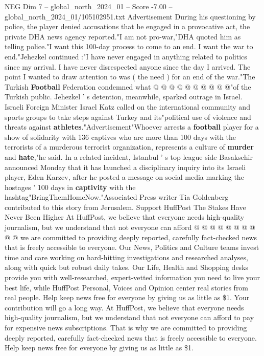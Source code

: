 \begin{textsample}{NEG Dim 7 – global\_north\_2024\_01 – Score -7.00 – global\_north\_2024\_01/105102951.txt}
Advertisement During his questioning by police, the player denied accusations that he engaged in a provocative act, the private DHA news agency reported."I am not pro-war,"DHA quoted him as telling police."I want this 100-day process to come to an end.
I want the war to end."Jehezkel continued :"I have never engaged in anything related to politics since my arrival.
I have never disrespected anyone since the day I arrived.
The point I wanted to draw attention to was ( the need ) for an end of the war."The Turkish \textbf{Football} Federation condemned what @ @ @ @ @ @ @ @ @ @"of the Turkish public.
Jehezkel ' s detention, meanwhile, sparked outrage in Israel.
Israeli Foreign Minister Israel Katz called on the international community and sports groups to take steps against Turkey and its"political use of violence and threats against \textbf{athletes}."Advertisement"Whoever arrests a \textbf{football} player for a show of solidarity with 136 captives who are more than 100 days with the terrorists of a murderous terrorist organization, represents a culture of \textbf{murder} and \textbf{hate},"he said.
In a related incident, Istanbul ' s top league side Basaksehir announced Monday that it has launched a disciplinary inquiry into its Israeli player, Eden Karzev, after he posted a message on social media marking the hostages ' 100 days in \textbf{captivity} with the hashtag"BringThemHomeNow."Associated Press writer Tia Goldenberg contributed to this story from Jerusalem.
Support HuffPost The Stakes Have Never Been Higher At HuffPost, we believe that everyone needs high-quality journalism, but we understand that not everyone can afford @ @ @ @ @ @ @ @ @ @ we are committed to providing deeply reported, carefully fact-checked news that is freely accessible to everyone.
Our News, Politics and Culture teams invest time and care working on hard-hitting investigations and researched analyses, along with quick but robust daily takes.
Our Life, Health and Shopping desks provide you with well-researched, expert-vetted information you need to live your best life, while HuffPost Personal, Voices and Opinion center real stories from real people.
Help keep news free for everyone by giving us as little as \$1.
Your contribution will go a long way.
At HuffPost, we believe that everyone needs high-quality journalism, but we understand that not everyone can afford to pay for expensive news subscriptions.
That is why we are committed to providing deeply reported, carefully fact-checked news that is freely accessible to everyone.
Help keep news free for everyone by giving us as little as \$1.

\end{textsample}
